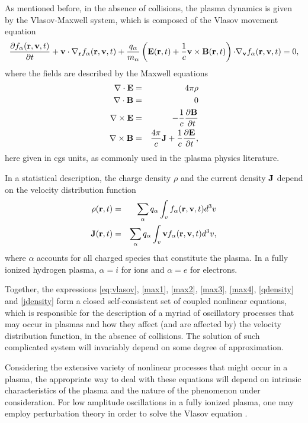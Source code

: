 \documentclass[12pt,a4paper,ruledheader]{report}
\begin{document}
As mentioned before, in the absence of collisions, the plasma
dynamics is given by the Vlasov-Maxwell system, which is composed
of the Vlasov movement equation
\begin{equation}
  \label{eq:vlasov}
  \frac{\partial f_{\alpha}({\bf r},{\bf v},t)}{\partial t}
  +{\bf v \cdot \nabla_r}f_{\alpha}({\bf r},{\bf v},t)
  +\frac{q_{\alpha}}{m_{\alpha}}
  \left({\bf E}({\bf r},t)+\frac{1}{c}{\bf v}\times {\bf B}({\bf r},t) \right)
  {\bf \cdot \nabla_v}f_{\alpha}({\bf r},{\bf v},t)=0,
\end{equation}
where the fields are described by the Maxwell equations
\begin{eqnarray}
  \label{max1}
  {\bf \nabla \cdot E}&=& 4\pi\rho\\
  \label{max2}
  {\bf \nabla \cdot B}&=& 0\\
  \label{max3}
    {\bf \nabla \times E}&=& -\frac{1}{c}
   \frac{\partial {\bf B}}{\partial t}\\
  \label{max4}
    {\bf \nabla \times B}&=& \frac{4\pi}{c}{\bf J}
    +\frac{1}{c}\frac{\partial{\bf E}}{\partial t},
\end{eqnarray}
here given in cgs units, as commonly used in the
;plasma physics literature.


In a statistical description, the charge density $\rho$
and the current density ${\bf J}$ depend on the velocity
distribution function
\begin{eqnarray}
  \label{qdensity}
    \rho({\bf r},t)
  &=&\sum_{\alpha}q_{\alpha}\int_v
    f_{\alpha}({\bf r},{\bf v},t)d^3v\\
\label{jdensity}
  {\bf J}({\bf r},t)
  &=&\sum_{\alpha}q_{\alpha}\int_v{\bf v}
  f_{\alpha}({\bf r},{\bf v},t) d^3v,
\end{eqnarray}
where $\alpha$ accounts for all charged species that constitute
the plasma. In a fully ionized hydrogen plasma, $\alpha=i$ for
ions and $\alpha=e$ for electrons.

Together, the expressions \eqref{eq:vlasov}, \eqref{max1},
\eqref{max2}, \eqref{max3}, \eqref{max4}, \eqref{qdensity}
and \eqref{jdensity} form a closed self-consistent set
of coupled nonlinear equations, which is responsible for the
description of a myriad of oscillatory processes that may
occur in plasmas and how they affect (and are affected by) the
velocity distribution function, in the absence of collisions.
The solution of such complicated system  will invariably depend
on some degree of approximation.

Considering the extensive variety of nonlinear processes that
might occur in a plasma, the appropriate way to deal with these
equations will depend on intrinsic characteristics of the plasma
and the nature of the phenomenon under consideration. For low
amplitude oscillations in a fully ionized plasma, one may employ
perturbation theory in order to solve the Vlasov equation
\cite{klimo}.
\end{document}
